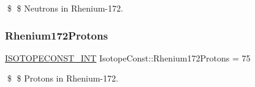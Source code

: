 \$ \$ Neutrons in Rhenium-\/172. \mbox{\label{group___isotope_const-_rhenium-_re172_gaa07c21cee978233a849335e916cf7691}} 
\subsubsection{\texorpdfstring{Rhenium172\+Protons}{Rhenium172Protons}}
{\footnotesize\ttfamily \mbox{\hyperlink{group___isotope_const-_macros_ga5f18360b3e99483a35c32d789e62621c}{I\+S\+O\+T\+O\+P\+E\+C\+O\+N\+S\+T\+\_\+\+I\+NT}} Isotope\+Const\+::\+Rhenium172\+Protons = 75}

\$ \$ Protons in Rhenium-\/172. 